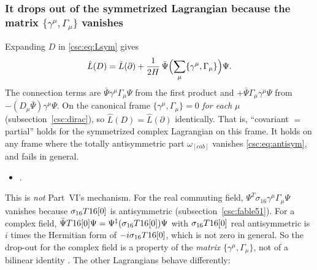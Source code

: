 \subsubsection{It drops out of the symmetrized Lagrangian because the matrix \texorpdfstring{$\{\gamma^\mu,\Gamma_\mu\}$}{anticommutator} vanishes}
\label{sec:9.12.2}

Expanding $D$ in \eqref{csc:eq:Lsym} gives \cfderived
\begin{equation}
  \hat L(D)=\hat L(\partial)+\frac{1}{2H}\,\bar\Psi\Bigl(\sum_\mu\{\gamma^\mu,\Gamma_\mu\}\Bigr)\Psi .
\end{equation}
The connection terms are $\bar\Psi\gamma^\mu\Gamma_\mu\Psi$ from the first product and
$+\bar\Psi\Gamma_\mu\gamma^\mu\Psi$ from $-(D_\mu\bar\Psi)\gamma^\mu\Psi$. On the canonical frame
$\{\gamma^\mu,\Gamma_\mu\}=0$ \emph{for each} $\mu$ (subsection~\ref{csc:dirac}), so
$\hat L(D)=\hat L(\partial)$ identically. That is, ``covariant $=$ partial'' holds for the
symmetrized complex Lagrangian on this frame. It holds on any frame where the totally antisymmetric
part $\omega_{[cab]}$ vanishes \eqref{csc:eq:antisym}, and fails in general.
\begin{itemize}
  \item {} .
\end{itemize}
This is \emph{not} Part~VI's mechanism. For the real commuting field,
$\Psi^T\sigma_{16}\gamma^\mu\Gamma_\mu\Psi$ vanishes because $\sigma_{16}T16[0]$ is antisymmetric
(subsection~\ref{csc:fable51}). For a complex field,
$\bar\Psi T16[0]\Psi=\Psi^\ddagger(\sigma_{16}T16[0])\Psi$ with $\sigma_{16}T16[0]$ real
antisymmetric is $i$ times the Hermitian form of $-i\sigma_{16}T16[0]$, which is not zero in
general. So the drop-out for the complex field is a property of the \emph{matrix}
$\{\gamma^\mu,\Gamma_\mu\}$, not of a bilinear identity \cfderived. The other Lagrangians behave
differently:
